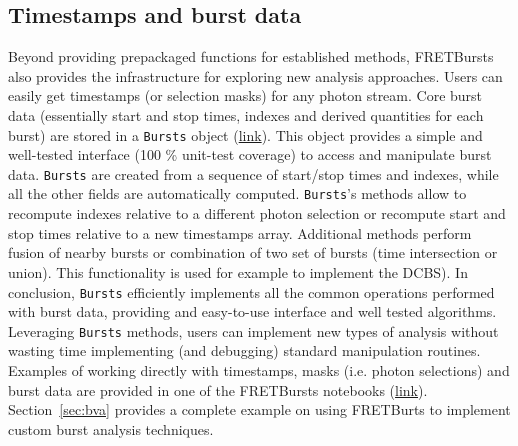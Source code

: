 \subsection{Timestamps and burst data}
\label{sec:burststimes}

Beyond providing prepackaged functions for established methods, 
FRETBursts also provides the infrastructure for exploring new analysis approaches.
Users can easily get timestamps (or selection masks) for any photon stream.
Core burst data (essentially start and stop times, indexes 
and derived quantities for each burst) are stored in a \verb|Bursts| object 
(\href{http://fretbursts.readthedocs.org/en/latest/burstsearch.html}{link}).
This object provides a simple and well-tested interface (100 \% unit-test coverage) 
to access and manipulate burst data. \verb|Bursts| are created from a sequence of start/stop 
times and indexes, while all the other fields are automatically
computed. \verb|Bursts|'s methods allow to recompute indexes relative to a different photon
selection or recompute start and stop times relative to a new timestamps array.
Additional methods perform fusion of nearby bursts or combination of two set of bursts 
(time intersection or union). This functionality is used for example to implement 
the DCBS).
In conclusion, \verb|Bursts| efficiently implements all the common operations performed 
with burst data, providing and easy-to-use interface and well tested algorithms. 
Leveraging \verb|Bursts| methods, users can implement new types of analysis without 
wasting time implementing (and debugging) standard manipulation routines.
Examples of working directly with timestamps, masks (i.e. photon selections) and 
burst data are provided in one of the FRETBursts notebooks (\href{http://nbviewer.jupyter.org/github/tritemio/FRETBursts_notebooks/blob/master/notebooks/Example%20-%20Working%20with%20timestamps%20and%20bursts.ipynb}{link}). 
Section~\ref{sec:bva} provides a complete example on using FRETBurts to implement 
custom burst analysis techniques.

